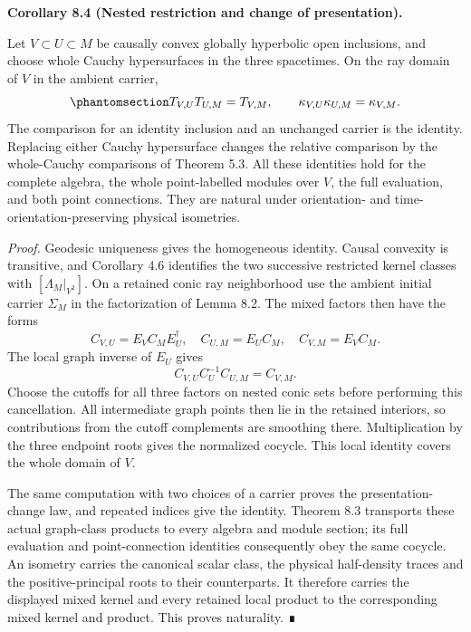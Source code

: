 \documentclass[
  english,
  11pt,
  reqno]{amsart}
\makeatletter
\newcommand{\pandocstatementheading}[1]{%
  \par\addpenalty{\@beginparpenalty}%
  \addvspace{.5\baselineskip plus .2\baselineskip minus .2\baselineskip}%
  {\normalfont\bfseries #1\par}%
  \nobreak\@afterindenttrue\@afterheading
}
\makeatother
\begin{document}
\pandocstatementheading{\protect{}\label{cor:relative-carrier-coherence}Corollary 8.4 (Nested restriction and change of presentation).}

Let \(V\subset U\subset M\) be causally convex globally hyperbolic open
inclusions, and choose whole Cauchy hypersurfaces in the three
spacetimes. On the ray domain of \(V\) in the ambient carrier,
\begin{equation}\protect\phantomsection\label{eq:relative-carrier-cocycle}{
T_{V,U}T_{U,M}=T_{V,M},
\qquad
\kappa_{V,U}\kappa_{U,M}=\kappa_{V,M}.
}\end{equation} The comparison for an identity inclusion and an
unchanged carrier is the identity. Replacing either Cauchy hypersurface
changes the relative comparison by the whole-Cauchy comparisons of
Theorem 5.3. All these identities hold for the complete algebra, the
whole point-labelled modules over \(V\), the full evaluation, and both
point connections. They are natural under orientation- and
time-orientation-preserving physical isometries.

\emph{Proof.} Geodesic uniqueness gives the homogeneous identity. Causal
convexity is transitive, and Corollary 4.6 identifies the two successive
restricted kernel classes with \([\Lambda_M|_{V^2}]\). On a retained
conic ray neighborhood use the ambient initial carrier \(\Sigma_M\) in
the factorization of Lemma 8.2. The mixed factors then have the forms \[
C_{V,U}=E_VC_ME_U^{\dagger},
\quad C_{U,M}=E_UC_M,
\quad C_{V,M}=E_VC_M.
\] The local graph inverse of \(E_U\) gives \[
C_{V,U}C_U^{-1}C_{U,M}=C_{V,M}.
\] Choose the cutoffs for all three factors on nested conic sets before
performing this cancellation. All intermediate graph points then lie in
the retained interiors, so contributions from the cutoff complements are
smoothing there. Multiplication by the three endpoint roots gives the
normalized cocycle. This local identity covers the whole domain of
\(V\).

The same computation with two choices of a carrier proves the
presentation-change law, and repeated indices give the identity. Theorem
8.3 transports these actual graph-class products to every algebra and
module section; its full evaluation and point-connection identities
consequently obey the same cocycle. An isometry carries the canonical
scalar class, the physical half-density traces and the
positive-principal roots to their counterparts. It therefore carries the
displayed mixed kernel and every retained local product to the
corresponding mixed kernel and product. This proves naturality. ∎
\end{document}
